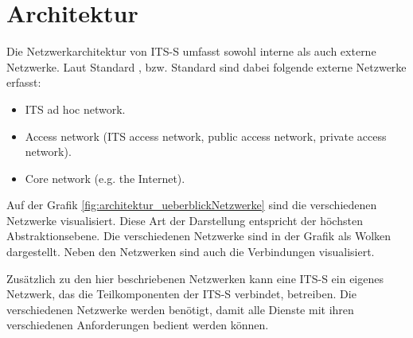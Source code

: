\chapter{Architektur  \label{chap_archtitektur}}
Die Netzwerkarchitektur von \ac{ITS-S} umfasst sowohl interne als auch externe Netzwerke. Laut Standard \cite{etsi302636-3}, bzw. Standard \cite{etsi102636-3} sind dabei folgende externe Netzwerke erfasst:

\begin{itemize}
 	\item ITS ad hoc network.
	\item Access network (ITS access network, public access network, private access network).
	\item Core network (e.g. the Internet).
\end{itemize}

Auf der Grafik \ref{fig:architektur_ueberblickNetzwerke} sind die verschiedenen Netzwerke visualisiert. Diese Art der Darstellung entspricht der höchsten Abstraktionsebene. Die verschiedenen Netzwerke sind in der Grafik als Wolken dargestellt. Neben den Netzwerken sind auch die Verbindungen visualisiert.


Zusätzlich zu den hier beschriebenen Netzwerken kann eine \ac{ITS-S} ein eigenes Netzwerk, das die Teilkomponenten der \ac{ITS-S} verbindet, betreiben. Die verschiedenen Netzwerke werden benötigt, damit alle Dienste mit ihren verschiedenen Anforderungen bedient werden können.

